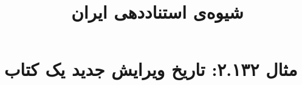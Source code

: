 \documentclass[a4paper,10pt]{article}
\begin{document}
\title{شیوه‌ی استناددهی ایران
 }
\author{}
\date{}
\maketitle



\section*{مثال ۲.۱۳۲: تاریخ ویرایش جدید یک کتاب}

\cite{زادمرد1342}\\
\cite{trollope1977}\\






\end{document}
